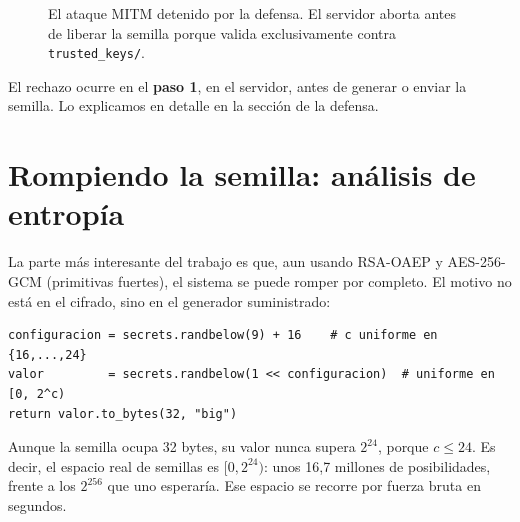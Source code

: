 \documentclass[11pt,a4paper]{article}
\begin{document}
\begin{figure}[h]\centering
{}
\caption{El ataque MITM detenido por la defensa. El servidor aborta antes de
liberar la semilla porque valida exclusivamente contra \texttt{trusted\_keys/}.}
\label{fig:mitm}
\end{figure}

El rechazo ocurre en el \textbf{paso 1}, en el servidor, antes de generar o enviar
la semilla. Lo explicamos en detalle en la sección de la defensa.

\section{Rompiendo la semilla: análisis de entropía}

La parte más interesante del trabajo es que, aun usando RSA-OAEP y AES-256-GCM
(primitivas fuertes), el sistema se puede romper por completo. El motivo no está
en el cifrado, sino en el generador suministrado:

\begin{lstlisting}
configuracion = secrets.randbelow(9) + 16    # c uniforme en {16,...,24}
valor         = secrets.randbelow(1 << configuracion)  # uniforme en [0, 2^c)
return valor.to_bytes(32, "big")
\end{lstlisting}

Aunque la semilla ocupa 32 bytes, su valor nunca supera $2^{24}$, porque
$c\le 24$. Es decir, el espacio real de semillas es $[0,2^{24})$: unos 16,7
millones de posibilidades, frente a los $2^{256}$ que uno esperaría. Ese espacio
se recorre por fuerza bruta en segundos.
\end{document}
